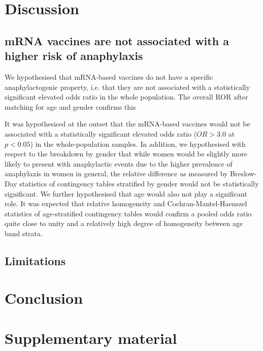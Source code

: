 \documentclass{article}
\begin{document}
\section{Discussion}

\subsection{mRNA vaccines are not associated with a higher risk of anaphylaxis}

We hypothesised that mRNA-based vaccines do not have a specific anaphylactogenic property, i.e. that they are not associated with a statistically significant elevated odds ratio in the whole population.
The overall ROR after matching for age and gender confirms this



It was hypothesised at the outset that the mRNA-based vaccines would not be associated with a statistically significant elevated odds ratio ($OR > 3.0$ at $p < 0.05$) in the whole-population samples.
In addition, we hypothesised with respect to the breakdown by gender that while women would be slightly more likely to present with anaphylactic events due to the higher prevalence of anaphylaxis in women in general,\cite{salvati2019gender} the relative difference as measured by Breslow-Day statistics of contingency tables stratified by gender would not be statistically significant.
We further hypothesised that age would also not play a significant role.
It was expected that relative homogeneity and Cochran-Mantel-Haenszel statistics of age-stratified contingency tables would confirm a pooled odds ratio quite close to unity and a relatively high degree of homogeneity between age band strata.


\subsection{Limitations}

\section{Conclusion}

\vspace{6pt}

\section*{Supplementary material}
\end{document}
